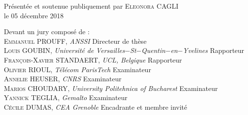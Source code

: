 \documentclass[
11pt, %
english, %
singlespacing, %
headsepline, %
]{MastersDoctoralThesis} %
\theoremstyle{remark}
\begin{document}
\begin{titlepage}
\begin{center}
% 

\vspace*{.04\textheight}
\large{Pr\'esent\'ee et soutenue publiquement par \textsc{Eleonora CAGLI}}\\
\large{le 05 d\'ecembre 2018}

\end{center}

\vspace*{.04\textheight}

\begin{minipage}[t]{\textwidth}
\vspace*{0.3cm}
\large{Devant un jury compos\'e de :}\\

\textsc{Emmanuel PROUFF, } \textit{ANSSI} \hfill Directeur de th\`ese \\
  \textsc{Louis GOUBIN, } \normalsize{\textit{Universit\'e de 
Versailles$-$St$-$Quentin$-$en$-$Yvelines}} \hfill \large{Rapporteur\\
\textsc{Fran\c{c}ois-Xavier STANDAERT, } \textit{UCL, Belgique} \hfill Rapporteur\\
  \textsc{Olivier RIOUL, } \textit{T\'el\'ecom ParisTech} \hfill Examinateur \\
 \textsc{Annelie HEUSER, } \textit{CNRS} \hfill Examinateur\\
\textsc{Marios CHOUDARY, } \textit{University Politehnica of Bucharest} \hfill Examinateur\\
 \textsc{Yannick TEGLIA, } \textit{Gemalto} \hfill Examinateur\\
 \textsc{C\'ecile DUMAS, } \textit{CEA Grenoble} \hfill Encadrante et membre invit\'e }


\end{minipage}
\end{titlepage}
\end{document}

